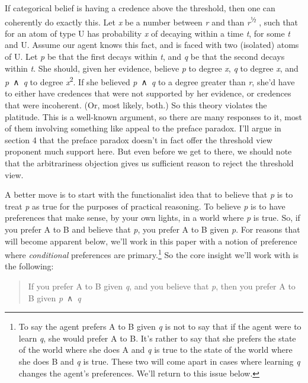 \documentclass[
  10pt,
  letterpaper,
  DIV=11,
  numbers=noendperiod,
  twoside]{scrartcl}
\begin{document}
If categorical belief is having a credence above the threshold, then one
can coherently do exactly this. Let \emph{x} be a number between
\emph{r} and than \emph{r}\textsuperscript{½} , such that for an atom of
type U has probability \emph{x} of decaying within a time \emph{t}, for
some \emph{t} and U. Assume our agent knows this fact, and is faced with
two (isolated) atoms of U. Let \emph{p} be that the first decays within
\emph{t}, and \emph{q} be that the second decays within \emph{t}. She
should, given her evidence, believe \emph{p} to degree \emph{x},
\emph{q} to degree \emph{x}, and \emph{p}~∧~\emph{q} to degree
\emph{x}\textsuperscript{2}. If she believed \emph{p}~∧~\emph{q} to a
degree greater than \emph{r}, she'd have to either have credences that
were not supported by her evidence, or credences that were incoherent.
(Or, most likely, both.) So this theory violates the platitude. This is
a well-known argument, so there are many responses to it, most of them
involving something like appeal to the preface paradox. I'll argue in
section 4 that the preface paradox doesn't in fact offer the threshold
view proponent much support here. But even before we get to there, we
should note that the arbitrariness objection gives us sufficient reason
to reject the threshold view.

A better move is to start with the functionalist idea that to believe
that \emph{p} is to treat \emph{p} as true for the purposes of practical
reasoning. To believe \emph{p} is to have preferences that make sense,
by your own lights, in a world where \emph{p} is true. So, if you prefer
A to B and believe that \emph{p}, you prefer A to B given \emph{p}. For
reasons that will become apparent below, we'll work in this paper with a
notion of preference where \emph{conditional} preferences are
primary.\footnote{To say the agent prefers A to B given \emph{q} is not
  to say that if the agent were to learn \emph{q}, she would prefer A to
  B. It's rather to say that she prefers the state of the world where
  she does A and \emph{q} is true to the state of the world where she
  does B and \emph{q} is true. These two will come apart in cases where
  learning \emph{q} changes the agent's preferences. We'll return to
  this issue below.} So the core insight we'll work with is the
following:

\begin{quote}
If you prefer A to B given \emph{q}, and you believe that \emph{p}, then
you prefer A to B given \emph{p}~∧~\emph{q}
\end{quote}
\end{document}
